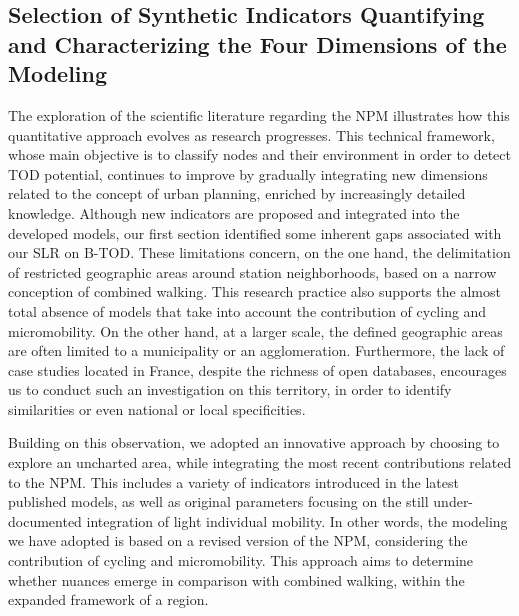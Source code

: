 \begin{refsegment}
\newpage
{} %
\section{Selection of Synthetic Indicators Quantifying and Characterizing the Four Dimensions of the Modeling
    \label{chap6:selection-indicateurs}
    }

The exploration of the scientific literature regarding the \acrshort{NPM} illustrates how this quantitative approach evolves as research progresses. This technical framework, whose main objective is to classify nodes and their environment in order to detect \acrshort{TOD} potential, continues to improve by gradually integrating new dimensions related to the concept of urban planning, enriched by increasingly detailed knowledge. Although new indicators are proposed and integrated into the developed models, our first section identified some inherent gaps associated with our \acrshort{SLR} on \acrshort{B-TOD}. These limitations concern, on the one hand, the delimitation of restricted geographic areas around station neighborhoods, based on a narrow conception of combined walking. This research practice also supports the almost total absence of models that take into account the contribution of cycling and micromobility. On the other hand, at a larger scale, the defined geographic areas are often limited to a municipality or an agglomeration. Furthermore, the lack of case studies located in France, despite the richness of open databases, encourages us to conduct such an investigation on this territory, in order to identify similarities or even national or local specificities.%

Building on this observation, we adopted an innovative approach by choosing to explore an uncharted area, while integrating the most recent contributions related to the \acrshort{NPM}. This includes a variety of indicators introduced in the latest published models, as well as original parameters focusing on the still under-documented integration of light individual mobility. In other words, the modeling we have adopted is based on a revised version of the \acrshort{NPM}, considering the contribution of cycling and micromobility. This approach aims to determine whether nuances emerge in comparison with combined walking, within the expanded framework of a region.%


\end{refsegment}
